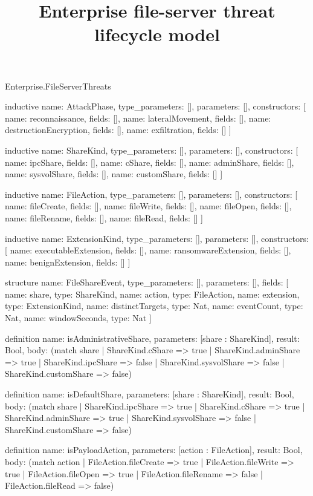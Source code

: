 \begin{lexlean}{Enterprise.FileServerThreats}
\title{Enterprise file-server threat lifecycle model}
\begin{semanticmodule}
inductive{
  name: AttackPhase,
  type_parameters: [],
  parameters: [],
  constructors: [
    {name: reconnaissance, fields: []},
    {name: lateralMovement, fields: []},
    {name: destructionEncryption, fields: []},
    {name: exfiltration, fields: []}
  ]
}

inductive{
  name: ShareKind,
  type_parameters: [],
  parameters: [],
  constructors: [
    {name: ipcShare, fields: []},
    {name: cShare, fields: []},
    {name: adminShare, fields: []},
    {name: sysvolShare, fields: []},
    {name: customShare, fields: []}
  ]
}

inductive{
  name: FileAction,
  type_parameters: [],
  parameters: [],
  constructors: [
    {name: fileCreate, fields: []},
    {name: fileWrite, fields: []},
    {name: fileOpen, fields: []},
    {name: fileRename, fields: []},
    {name: fileRead, fields: []}
  ]
}

inductive{
  name: ExtensionKind,
  type_parameters: [],
  parameters: [],
  constructors: [
    {name: executableExtension, fields: []},
    {name: ransomwareExtension, fields: []},
    {name: benignExtension, fields: []}
  ]
}

structure{
  name: FileShareEvent,
  type_parameters: [],
  parameters: [],
  fields: [
    {name: share, type: ShareKind},
    {name: action, type: FileAction},
    {name: extension, type: ExtensionKind},
    {name: distinctTargets, type: Nat},
    {name: eventCount, type: Nat},
    {name: windowSeconds, type: Nat}
  ]
}

definition{
  name: isAdministrativeShare,
  parameters: [share : ShareKind],
  result: Bool,
  body: (match share
    | ShareKind.cShare => true
    | ShareKind.adminShare => true
    | ShareKind.ipcShare => false
    | ShareKind.sysvolShare => false
    | ShareKind.customShare => false)
}

definition{
  name: isDefaultShare,
  parameters: [share : ShareKind],
  result: Bool,
  body: (match share
    | ShareKind.ipcShare => true
    | ShareKind.cShare => true
    | ShareKind.adminShare => true
    | ShareKind.sysvolShare => false
    | ShareKind.customShare => false)
}

definition{
  name: isPayloadAction,
  parameters: [action : FileAction],
  result: Bool,
  body: (match action
    | FileAction.fileCreate => true
    | FileAction.fileWrite => true
    | FileAction.fileOpen => true
    | FileAction.fileRename => false
    | FileAction.fileRead => false)
}


\end{semanticmodule}
\end{lexlean}
